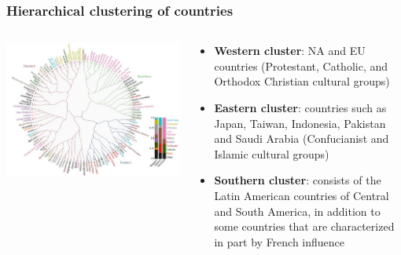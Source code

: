\documentclass[aspectratio=169]{beamer}
\begin{document}
\begin{frame}
    \frametitle{Hierarchical clustering of countries}
    \begin{columns}[totalwidth=1.0\textwidth]
        \begin{column}{0.6\linewidth}
            \includegraphics[width=1.0\linewidth]{assets/countries-mme.jpg}
        \end{column}
        \begin{column}{0.4\linewidth}
            \begin{itemize}
                \item \textbf{Western cluster}: NA and EU countries (Protestant, Catholic, and Orthodox Christian cultural groups)
                \item \textbf{Eastern cluster}: countries such as Japan, Taiwan, Indonesia, Pakistan and Saudi Arabia (Confucianist and Islamic cultural groups)
                \item \textbf{Southern cluster}: consists of the Latin American countries of Central and South America, in addition to some countries that are characterized in part by French influence
            \end{itemize}
        \end{column}
    \end{columns}
\end{frame}
\end{document}
